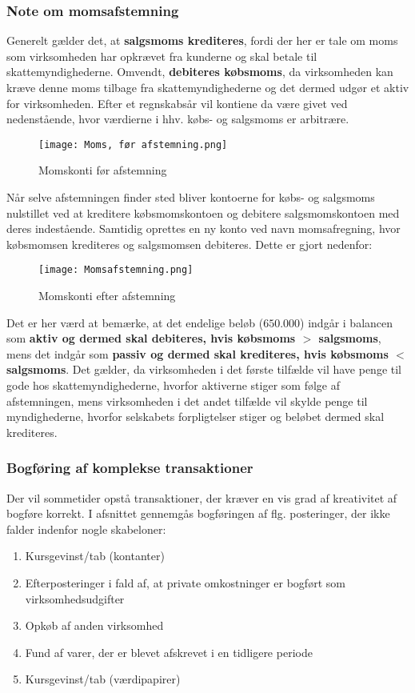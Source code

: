 \documentclass[10pt,reqno, usenames]{article}
\begin{document}
\subsubsection{Note om momsafstemning}
Generelt gælder det, at \textbf{salgsmoms krediteres}, fordi der her er tale om moms som virksomheden har opkrævet fra kunderne og skal betale til skattemyndighederne. Omvendt, \textbf{debiteres købsmoms}, da virksomheden kan kræve denne moms tilbage fra skattemyndighederne og det dermed udgør et aktiv for virksomheden. Efter et regnskabsår vil kontiene da være givet ved nedenstående, hvor værdierne i hhv. købs- og salgsmoms er arbitrære. \\
\begin{figure}[t]
     \centering
     \texttt{[image: Moms, før afstemning.png]}
     \caption{Momskonti før afstemning}
     \label{Figur 1}
\end{figure} 
Når selve afstemningen finder sted bliver kontoerne for købs- og salgsmoms nulstillet ved at kreditere købsmomskontoen og debitere salgsmomskontoen med deres indestående. Samtidig oprettes en ny konto ved navn momsafregning, hvor købsmomsen krediteres og salgsmomsen debiteres. Dette er gjort nedenfor: 

\begin{figure}[h]
     \centering
     \texttt{[image: Momsafstemning.png]}
     \caption{Momskonti efter afstemning}
     \label{Figur 1}
\end{figure} 

Det er her værd at bemærke, at det endelige beløb ($650.000$) indgår i balancen som \textbf{aktiv og dermed skal debiteres, hvis købsmoms $>$ salgsmoms}, mens det indgår som \textbf{passiv og dermed skal krediteres, hvis købsmoms $<$ salgsmoms}. Det gælder, da virksomheden i det første tilfælde vil have penge til gode hos skattemyndighederne, hvorfor aktiverne stiger som følge af afstemningen, mens virksomheden i det andet tilfælde vil skylde penge til myndighederne, hvorfor selskabets forpligtelser stiger og beløbet dermed skal krediteres. 

\subsubsection{Bogføring af komplekse transaktioner}
Der vil sommetider opstå transaktioner, der kræver en vis grad af kreativitet af bogføre korrekt. I afsnittet gennemgås bogføringen af flg. posteringer, der ikke falder indenfor nogle skabeloner: 
\begin{enumerate}
    \item Kursgevinst/tab (kontanter)
    \item Efterposteringer i fald af, at private omkostninger er bogført som virksomhedsudgifter
    \item Opkøb af anden virksomhed
    \item Fund af varer, der er blevet afskrevet i en tidligere periode
    \item Kursgevinst/tab (værdipapirer)
\end{enumerate}
\end{document}
